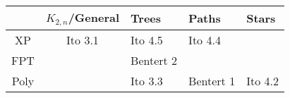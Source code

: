 
\renewcommand{\arraystretch}{1.3}
\begin{tabularx}{\textwidth}{|c||c|Y|Y|Y|}
	\hline

	&
	$K_{2,n}$/General &
	Trees &
	Paths &
	Stars \\

	\hline
	\hline

	XP &
	 Ito 3.1 &
	 Ito 4.5 &
	 Ito 4.4 &
	 \\

	\hline

	FPT &
	 &
	 Bentert 2 &
	&
	 \\

	\hline

	Poly &
	 &
	 Ito 3.3 &
	 Bentert 1 &
	 Ito 4.2 \\

	\hline
\end{tabularx}
\renewcommand{\arraystretch}{1}
